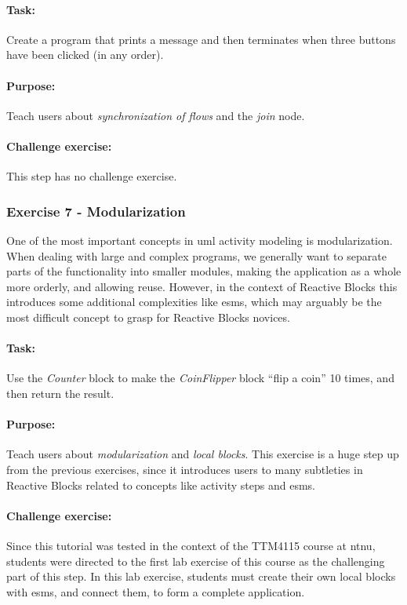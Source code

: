 \paragraph{Task:} Create a program that prints a message and then terminates when three buttons have been clicked (in any order).

\paragraph{Purpose:} Teach users about \emph{synchronization of flows} and the \emph{join} node.

\paragraph{Challenge exercise:} This step has no challenge exercise.

\subsubsection{Exercise 7 - Modularization}
One of the most important concepts in \gls{uml} activity modeling is modularization. When dealing with large and complex programs, we generally want to separate parts of the functionality into smaller modules, making the application as a whole more orderly, and allowing reuse. However, in the context of Reactive Blocks this introduces some additional complexities like \glspl{esm}, which may arguably be the most difficult concept to grasp for Reactive Blocks novices.

\paragraph{Task:} Use the \emph{Counter} block to make the \emph{CoinFlipper} block ``flip a coin'' 10 times, and then return the result.

\paragraph{Purpose:} Teach users about \emph{modularization} and \emph{local blocks}. This exercise is a huge step up from the previous exercises, since it introduces users to many subtleties in Reactive Blocks related to concepts like activity steps and \glspl{esm}.

\paragraph{Challenge exercise:} Since this tutorial was tested in the context of the TTM4115 course at \gls{ntnu}, students were directed to the first lab exercise of this course as the challenging part of this step. In this lab exercise, students must create their own local blocks with \glspl{esm}, and connect them, to form a complete application.

